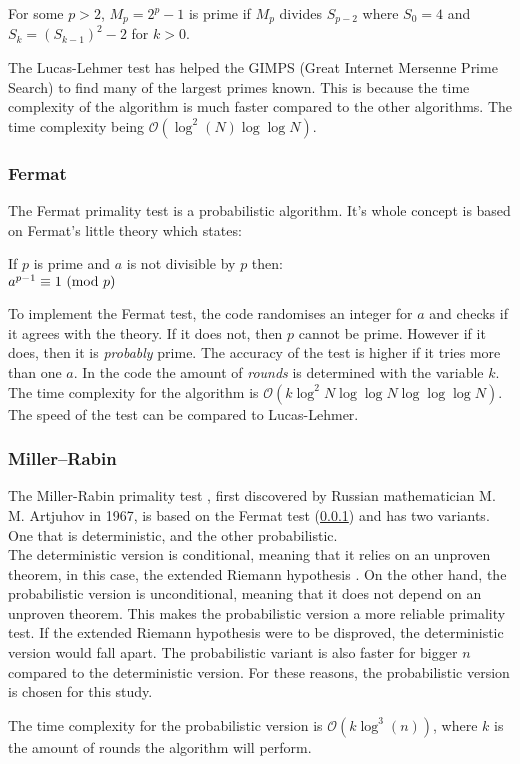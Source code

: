 \documentclass[main.tex]{subfiles}
\begin{document}
\begin{mdframed}
  For some $p>2$, $M_p=2^p-1$ is prime if $M_p$ divides $S_{p-2}$ where $S_0=4$ and
  $S_k=(S_{k-1})^2-2$ for $k>0$.
\end{mdframed}

The Lucas-Lehmer test has helped the GIMPS (Great Internet Mersenne Prime
Search) \cite{GIMPS} to find many of the largest primes known. This is because
the time complexity of the algorithm is much faster compared to the other
algorithms. The time complexity being $\mathcal{O}(\log^{2}(N) \log \log N)$.

\subsubsection{Fermat} \label{fermat} The Fermat primality test
\cite{algh:fermat} is a probabilistic algorithm. It's whole concept is based on
Fermat's little theory \cite{fermat:little} which states:

\begin{mdframed}
  \begin{center}
    If $p$ is prime and $a$ is not divisible by $p$ then: \\
    $a^{p - 1} \equiv 1 \ (\mathrm{mod}\ p)$
  \end{center}
\end{mdframed}

To implement the Fermat test, the code randomises an integer for $a$ and checks
if it agrees with the theory. If it does not, then $p$ cannot be prime. However
if it does, then it is \emph{probably} prime. The accuracy of the test is higher
if it tries more than one $a$. In the code the amount of \emph{rounds} is
determined with the variable $k$. The time complexity for the algorithm is
$\mathcal{O}(k \log^{2}N \log \log N \log \log \log N)$. The speed of the test
can be compared to Lucas-Lehmer.

\subsubsection{Miller–Rabin} The Miller-Rabin primality test \cite{algh:miller},
first discovered by Russian mathematician M. M. Artjuhov in 1967, is based on
the Fermat test (\ref{fermat}) and has two variants. One that is deterministic, and the other probabilistic. \\

The deterministic version is conditional, meaning that it relies on an unproven
theorem, in this case, the extended Riemann hypothesis \cite{riemann}. On the
other hand, the probabilistic version is unconditional, meaning that it does not
depend on an unproven theorem. This makes the probabilistic version a more
reliable primality test. If the extended Riemann hypothesis were to be
disproved, the deterministic version would fall apart. The probabilistic variant
is also faster for bigger $n$ compared to the deterministic version. For these
reasons, the probabilistic version is chosen for this study. \newline

The time complexity for the probabilistic version is $\mathcal{O}(k
\log^{3}(n))$, where $k$ is the amount of rounds the algorithm will perform.
\end{document}
